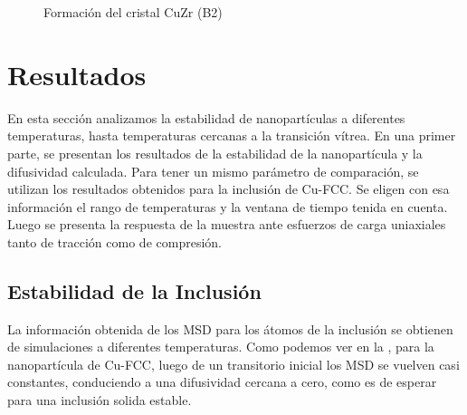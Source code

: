 
\begin{figure}[htp]
\centering
{}
\quad
{}
\caption{Formación del cristal CuZr (B2)}
\label{C4:fg:B2CuZr_Formation}
\end{figure}


\section{Resultados}
\label{S4_3}

En esta sección analizamos la estabilidad de nanopartículas a diferentes temperaturas, hasta temperaturas cercanas a la transición vítrea. En una primer parte, se presentan los resultados de la estabilidad de la nanopartícula y la difusividad calculada. Para tener un mismo parámetro de comparación, se utilizan los resultados obtenidos para la inclusión de Cu-FCC. Se eligen con esa información el rango de temperaturas y la ventana de tiempo tenida en cuenta. Luego se presenta la respuesta de la muestra ante esfuerzos de carga uniaxiales tanto de tracción como de compresión.

\subsection{Estabilidad de la Inclusión}
\label{S4_3_1}

La información obtenida de los MSD para los átomos de la inclusión se obtienen de simulaciones a diferentes temperaturas. Como podemos ver en la , para la nanopartícula de Cu-FCC, luego de un transitorio inicial los MSD se vuelven casi constantes, conduciendo a una difusividad cercana a cero, como es de esperar para una inclusión solida estable.

